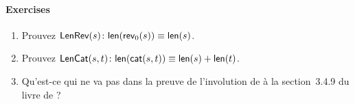 \paragraph{Exercises}

\begin{enumerate}

  \item Prouvez \(\textsf{LenRev}({s}) \colon \textsf{len}(\textsf{rev}_0(s))
    \equiv \textsf{len}(s)\).

  \item Prouvez \(\textsf{LenCat}({s,t}) \colon \textsf{len}(\textsf{cat}(s,t)) \equiv
  \textsf{len}(s) + \textsf{len}(t)\).

  \item Qu'est-ce qui ne va pas dans la preuve de l'involution de
   à la section~3.4.9 du livre de
  \cite{CousineauMauny_1998}?

\end{enumerate}
